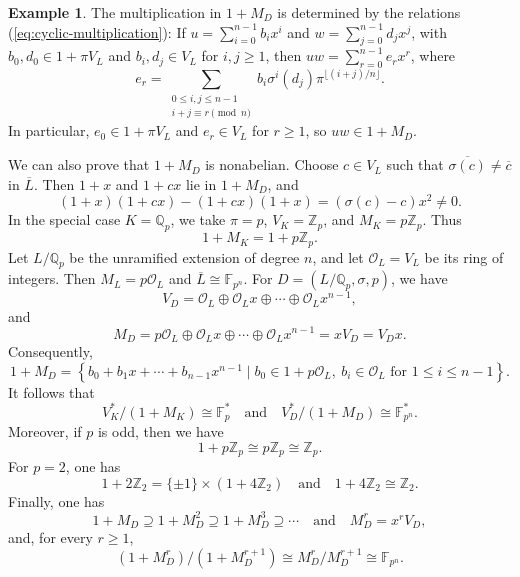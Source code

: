 \documentclass[11pt]{amsart}
\theoremstyle{definition}
\newtheorem{example}[theorem]{Example}
\begin{document}
\begin{example}
The multiplication in $1+M_D$ is determined by the relations (\ref{eq:cyclic-multiplication}): If $u=\sum_{i=0}^{n-1}b_i x^i$ and $w=\sum_{j=0}^{n-1}d_j x^j$, with $b_0,d_0\in 1+\pi V_L$ and $b_i,d_j\in V_L$ for $i,j\geq 1$, then
$uw=\sum_{r=0}^{n-1}e_r x^r$, where
\[
        e_r=
        \sum_{\substack{0\leq i,j\leq n-1\\ i+j\equiv r\pmod n}}
        b_i\sigma^i(d_j)\pi^{\lfloor (i+j)/n\rfloor}.
\]
In particular, $e_0\in 1+\pi V_L$ and $e_r\in V_L$ for $r\geq 1$, so
$uw\in 1+M_D$.

We can also prove that $1+M_D$ is nonabelian.  Choose
$c\in V_L$ such that $\overline{\sigma(c)}\ne \overline c$ in $\overline L$.
Then $1+x$ and $1+cx$ lie in $1+M_D$, and
\[
        (1+x)(1+cx)-(1+cx)(1+x)=(\sigma(c)-c)x^2\ne 0.
\]
In the special case $K=\mathbb Q_p$, we take $\pi=p$, $V_K=\mathbb Z_p$,
and $M_K=p\mathbb Z_p$.  Thus
\[
        1+M_K=1+p\mathbb Z_p.
\]
Let $L/\mathbb Q_p$ be the unramified extension of degree $n$, and let
$\mathcal O_L=V_L$ be its ring of integers.  Then $M_L=p\mathcal O_L$ and
$\overline L\cong\mathbb F_{p^n}$.  For $D=(L/\mathbb Q_p,\sigma,p)$, we have
\[
        V_D=\mathcal O_L\oplus \mathcal O_Lx\oplus\cdots\oplus
        \mathcal O_Lx^{n-1},
\]
and
\[
        M_D=p\mathcal O_L\oplus \mathcal O_Lx\oplus\cdots\oplus
        \mathcal O_Lx^{n-1}=xV_D=V_Dx.
\]
Consequently,
\[
        1+M_D
        =
        \left\{
        b_0+b_1x+\cdots+b_{n-1}x^{n-1}
        \mid
        b_0\in 1+p\mathcal O_L,\ b_i\in\mathcal O_L\text{ for }1\leq i\leq n-1
        \right\}.
\]
It follows that
\[
        V_K^*/(1+M_K)\cong\mathbb F_p^*
        \quad
        \text{and}
        \quad
        V_D^*/(1+M_D)\cong\mathbb F_{p^n}^*.
\]
Moreover, if $p$ is odd, then we have
\[
        1+p\mathbb Z_p\cong p\mathbb Z_p\cong\mathbb Z_p.
\]
For $p=2$, one has
\[
        1+2\mathbb Z_2=\{\pm 1\}\times (1+4\mathbb Z_2)
        \quad
        \text{and}
        \quad
        1+4\mathbb Z_2\cong\mathbb Z_2.
\]
Finally, one has
\[
        1+M_D\supseteq 1+M_D^2\supseteq 1+M_D^3\supseteq\cdots
        \quad\text{and}\quad M_D^r=x^rV_D,
\]
and, for every $r\geq 1$,
\[
        (1+M_D^r)/(1+M_D^{r+1})
        \cong
        M_D^r/M_D^{r+1}
        \cong
        \mathbb F_{p^n}.
\]
\end{example}
\end{document}
